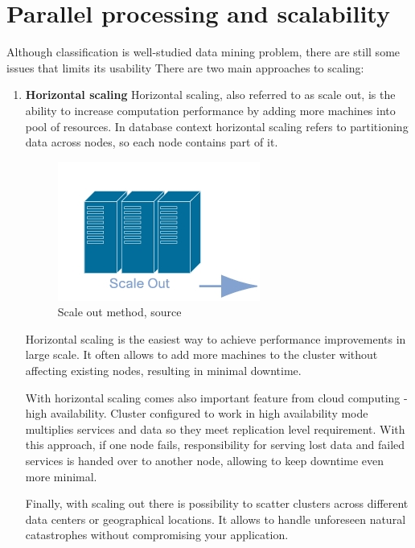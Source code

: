 \section{Parallel processing and scalability}
	Although classification is well-studied data mining problem, there are still some issues that limits its usability 
	There are two main approaches to scaling:
	\begin{enumerate}
		\item \textbf{Horizontal scaling}
		Horizontal scaling, also referred to as scale out, is the ability to increase computation performance by adding more machines into pool of resources. In database context horizontal scaling refers to partitioning data across nodes, so each node contains part of it.
		
		\begin{figure}[H]
			\begin{center}
				\includegraphics[width=0.5\linewidth]{images/scaleout.png}
				\caption{Scale out method, source \cite{scale_out_up} }
				\label{svm-plot2}
			\end{center}
		\end{figure}
		
		Horizontal scaling is the easiest way to achieve performance improvements in large scale. It often allows to add more machines to the cluster without affecting existing nodes, resulting in minimal downtime.
		
		With horizontal scaling comes also important feature from cloud computing - high availability. Cluster configured to work in high availability mode multiplies services and data so they meet replication level requirement. With this approach, if one node fails, responsibility for serving lost data and failed services is handed over to another node, allowing to keep downtime even more minimal.
		
		Finally, with scaling out there is possibility to scatter clusters across different data centers or geographical locations. It allows to handle unforeseen natural catastrophes without compromising your application.
		

\end{enumerate}

